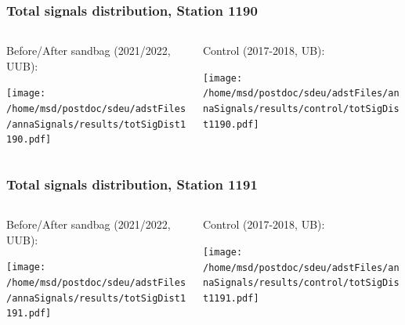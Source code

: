 \documentclass[aspectratio=169]{beamer}
\begin{document}
\begin{frame}
  \frametitle{Total signals distribution, Station 1190}
  
  \begin{columns}[T,c]
    \begin{column}{.5\textwidth}
      Before/After sandbag (2021/2022, UUB):
      \vspace{.3cm}

      \texttt{[image: /home/msd/postdoc/sdeu/adstFiles/annaSignals/results/totSigDist1190.pdf]}
    \end{column}
    \begin{column}{.5\textwidth}
      Control (2017-2018, UB):
      \vspace{0.3cm}

      \texttt{[image: /home/msd/postdoc/sdeu/adstFiles/annaSignals/results/control/totSigDist1190.pdf]}
    \end{column}    
\end{columns}
\end{frame}

\begin{frame}
  \frametitle{Total signals distribution, Station 1191}
  
  \begin{columns}[T,c]
    \begin{column}{.5\textwidth}
      Before/After sandbag (2021/2022, UUB):
      \vspace{.3cm}

      \texttt{[image: /home/msd/postdoc/sdeu/adstFiles/annaSignals/results/totSigDist1191.pdf]}
    \end{column}
    \begin{column}{.5\textwidth}
      Control (2017-2018, UB):
      \vspace{0.3cm}

      \texttt{[image: /home/msd/postdoc/sdeu/adstFiles/annaSignals/results/control/totSigDist1191.pdf]}
    \end{column}    
\end{columns}
\end{frame}
\end{document}
